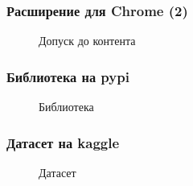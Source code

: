 \documentclass[xetex,mathserif,serif]{beamer}
\begin{document}
	\begin{frame}
		\frametitle{Расширение для Chrome (2)}
		\begin{figure}[h]
            \caption{Допуск до контента}
            \label{fig:image}
        \end{figure}
	\end{frame}	
	
	\begin{frame}
		\frametitle{Библиотека на pypi}
		\begin{figure}[h]
            \caption{Библиотека}
            \label{fig:image}
        \end{figure}
	\end{frame}	
	
	\begin{frame}
		\frametitle{Датасет на kaggle}
		\begin{figure}[h]
            \caption{Датасет}
            \label{fig:image}
        \end{figure}
	\end{frame}
	
\end{document}
